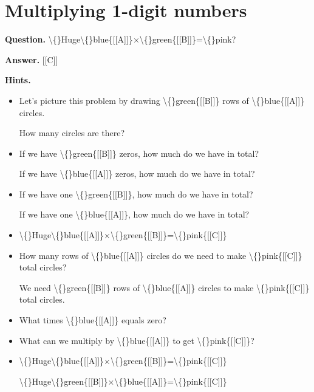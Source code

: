 \documentclass{article}
\begin{document}
\section*{Multiplying 1-digit numbers}
\textbf{Question.} \textbackslash\{\}Huge\textbackslash\{\}blue\{[[A]]\}$\times$\textbackslash\{\}green\{[[B]]\}=\textbackslash\{\}pink?

\textbf{Answer.} [[C]]

\textbf{Hints.}
\begin{itemize}
  \item Let's picture this problem by drawing \textbackslash\{\}green\{[[B]]\} rows of \textbackslash\{\}blue\{[[A]]\} circles.
                            
                            
                            
                                How many circles are there?
  \item If we have \textbackslash\{\}green\{[[B]]\} zeros, how much do we have in total?
                        
                        
                            If we have \textbackslash\{\}blue\{[[A]]\} zeros, how much do we have in total?
  \item If we have one \textbackslash\{\}green\{[[B]]\}, how much do we have in total?
                        
                        
                            If we have one \textbackslash\{\}blue\{[[A]]\}, how much do we have in total?
  \item \textbackslash\{\}Huge\textbackslash\{\}blue\{[[A]]\}$\times$\textbackslash\{\}green\{[[B]]\}=\textbackslash\{\}pink\{[[C]]\}
  \item How many rows of \textbackslash\{\}blue\{[[A]]\} circles do we need to make \textbackslash\{\}pink\{[[C]]\} total circles?
                            
                            
                            
                                We need \textbackslash\{\}green\{[[B]]\} rows of \textbackslash\{\}blue\{[[A]]\} circles to make \textbackslash\{\}pink\{[[C]]\} total circles.
  \item What times \textbackslash\{\}blue\{[[A]]\} equals zero?
  \item What can we multiply by \textbackslash\{\}blue\{[[A]]\} to get \textbackslash\{\}pink\{[[C]]\}?
  \item \textbackslash\{\}Huge\textbackslash\{\}blue\{[[A]]\}$\times$\textbackslash\{\}green\{[[B]]\}=\textbackslash\{\}pink\{[[C]]\}
                        
                        
                            \textbackslash\{\}Huge\textbackslash\{\}green\{[[B]]\}$\times$\textbackslash\{\}blue\{[[A]]\}=\textbackslash\{\}pink\{[[C]]\}
\end{itemize}
\end{document}
